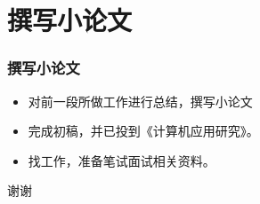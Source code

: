 \documentclass{beamer}
\begin{document}
\section{撰写小论文}
\begin{frame}
  \frametitle{撰写小论文}
  \begin{itemize}
    \item 对前一段所做工作进行总结，撰写小论文 
    \item 完成初稿，并已投到《计算机应用研究》。 
    \item 找工作，准备笔试面试相关资料。
  \end{itemize}
\end{frame}
\begin{frame}
 \begin{center}
  \LARGE 谢谢 
 \end{center}
\end{frame}
\end{document}
